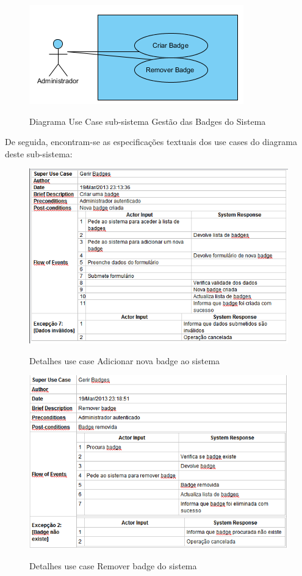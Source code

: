 \documentclass[12pt,a4paper]{article}
\begin{document}
\begin{figure}[h!]
\centering
\includegraphics[scale=1]{usecase/A_GerirBadges}
\label{usecase}
\caption{Diagrama Use Case sub-sistema Gestão das Badges do Sistema}
\end{figure}

De seguida, encontram-se as especificações textuais dos use cases do diagrama deste sub-sistema:\\

\begin{figure}[h!]
\centering
\includegraphics[scale=0.7]{d_usecase/A_criarbadge}
\label{usecase}
\caption{Detalhes use case Adicionar nova badge ao sistema}
\end{figure}

\begin{figure}[h!]
\centering
\includegraphics[scale=0.7]{d_usecase/A_removerbadge}
\label{usecase}
\caption{Detalhes use case Remover badge do sistema}
\end{figure}
\end{document}
